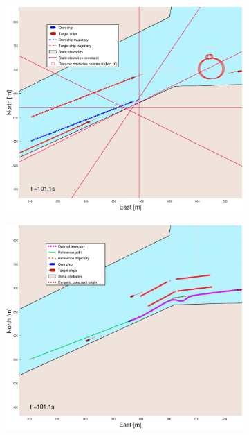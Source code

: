 \begin{figure}[!b] %
    \begin{subfigure}[b]{0.49\textwidth}
        \centering
        \includegraphics[width=\textwidth]{Images/Figures/Trheimfjord/_Simple_0fig1_time=101}
    \end{subfigure}
    \hfill
    \begin{subfigure}[b]{0.499\textwidth}
        \centering
        \includegraphics[width=\textwidth]{Images/Figures/Trheimfjord/_Simple_0fig999_time=101}

\end{subfigure}
\end{figure}
